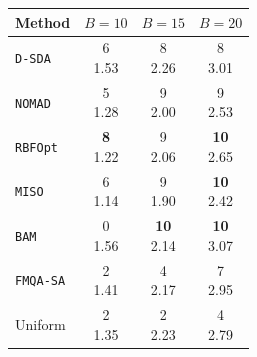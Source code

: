\begin{tabular}{@{}lccc@{}}\toprule
Method & \(B=10\) & \(B=15\) & \(B=20\)\\\midrule
\texttt{D-SDA} & \makecell{6\\1.53} & \makecell{8\\2.26} & \makecell{8\\3.01} \\
\texttt{NOMAD} & \makecell{5\\1.28} & \makecell{9\\2.00} & \makecell{9\\2.53} \\
\texttt{RBFOpt} & \makecell{\textbf{8}\\1.22} & \makecell{9\\2.06} & \makecell{\textbf{10}\\2.65} \\
\texttt{MISO} & \makecell{6\\1.14} & \makecell{9\\1.90} & \makecell{\textbf{10}\\2.42} \\
\texttt{BAM} & \makecell{0\\1.56} & \makecell{\textbf{10}\\2.14} & \makecell{\textbf{10}\\3.07} \\
\texttt{FMQA-SA} & \makecell{2\\1.41} & \makecell{4\\2.17} & \makecell{7\\2.95} \\
Uniform & \makecell{2\\1.35} & \makecell{2\\2.23} & \makecell{4\\2.79} \\
\bottomrule\end{tabular}
